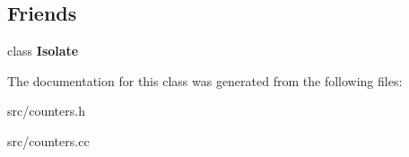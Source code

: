 \subsection*{Friends}
\begin{DoxyCompactItemize}
\item 
\hypertarget{classv8_1_1internal_1_1_stats_table_aba4f0964bdacf2bbf62cf876e5d28d0a}{}class {\bfseries Isolate}\label{classv8_1_1internal_1_1_stats_table_aba4f0964bdacf2bbf62cf876e5d28d0a}

\end{DoxyCompactItemize}


The documentation for this class was generated from the following files\+:\begin{DoxyCompactItemize}
\item 
src/counters.\+h\item 
src/counters.\+cc\end{DoxyCompactItemize}
